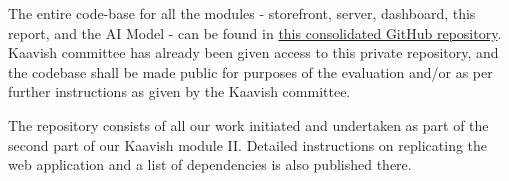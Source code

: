 The entire code-base for all the modules - storefront, server, dashboard, this report, and the AI Model - can be found in \href{https://github.com/osama-usuf/Kaavish-II-PORS}{this consolidated GitHub repository}. Kaavish committee has already been given access to this private repository, and the codebase shall be made public for purposes of the evaluation and/or as per further instructions as given by the Kaavish committee.

The repository consists of all our work initiated and undertaken as part of the second part of our Kaavish module II. Detailed instructions on replicating the web application and a list of dependencies is also published there.

